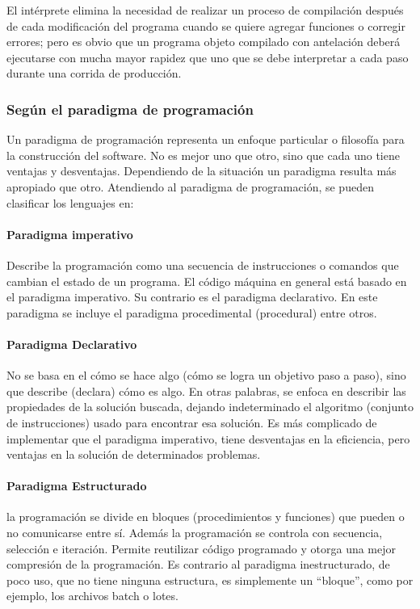 \documentclass[12pt,legalpaper]{report}
\begin{document}
El intérprete elimina la necesidad de realizar un proceso de compilación después de cada modificación del programa cuando se quiere agregar funciones o corregir errores; pero es obvio que un programa objeto compilado con antelación deberá ejecutarse con mucha mayor rapidez que uno que se debe interpretar a cada paso durante una corrida de producción.

			\subsubsection{Según el paradigma de programación}

Un paradigma de programación representa un enfoque particular o filosofía para la construcción del software. No es mejor uno que otro, sino que cada uno tiene ventajas y desventajas. Dependiendo de la situación un paradigma resulta más apropiado que otro. Atendiendo al paradigma de programación, se pueden clasificar los lenguajes en:


					\paragraph{Paradigma imperativo}
				
Describe la programación como una secuencia de instrucciones o comandos que cambian el estado de un programa. El código máquina en general está basado en el paradigma imperativo. Su contrario es el paradigma declarativo. En este paradigma se incluye el paradigma procedimental (procedural) entre otros.
				
					\paragraph{Paradigma Declarativo}

No se basa en el cómo se hace algo (cómo se logra un objetivo paso a paso), sino que describe (declara) cómo es algo. En otras palabras, se enfoca en describir las propiedades de la solución buscada, dejando indeterminado el algoritmo (conjunto de instrucciones) usado para encontrar esa solución. Es más complicado de implementar que el paradigma imperativo, tiene desventajas en la eficiencia, pero ventajas en la solución de determinados problemas.

					\paragraph{Paradigma Estructurado}

la programación se divide en bloques (procedimientos y funciones) que pueden o no comunicarse entre sí. Además la programación se controla con secuencia, selección e iteración. Permite reutilizar código programado y otorga una mejor compresión de la programación. Es contrario al paradigma inestructurado, de poco uso, que no tiene ninguna estructura, es simplemente un “bloque”, como por ejemplo, los archivos batch o lotes.
				
\end{document}
